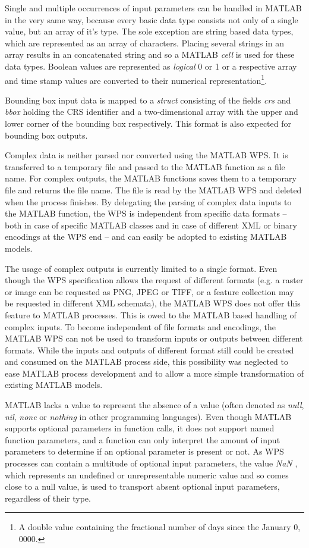 		Single and multiple occurrences of input parameters can be handled in MATLAB in the very same way, because every basic data type consists not only of a single value, but an array of it's type. The sole exception are string based data types, which are represented as an array of characters. Placing several strings in an array results in an concatenated string and so a MATLAB \emph{cell} is used for these data types. Boolean values are represented as \emph{logical} 0 or 1 or a respective array and time stamp values are converted to their numerical representation\footnote{A double value containing the fractional number of days since the January 0, 0000.}.

		Bounding box input data is mapped to a \emph{struct} consisting of the fields \emph{crs} and \emph{bbox} holding the \ac{CRS} identifier and a two-dimensional array with the upper and lower corner of the bounding box respectively. This format is also expected for bounding box outputs.

		Complex data is neither parsed nor converted using the MATLAB WPS. It is transferred to a temporary file and passed to the MATLAB function as a file name. For complex outputs, the MATLAB functions saves them to a temporary file and returns the file name. The file is read by the MATLAB WPS and deleted when the process finishes. By delegating the parsing of complex data inputs to the MATLAB function, the WPS is independent from specific data formats -- both in case of specific MATLAB classes and in case of different XML or binary encodings at the WPS end -- and can easily be adopted to existing MATLAB models.

		The usage of complex outputs is currently limited to a single format. Even though the WPS specification allows the request of different formats (e.g. a raster or image can be requested as PNG, JPEG or TIFF, or a feature collection may be requested in different XML schemata), the MATLAB WPS does not offer this feature to MATLAB processes. This is owed to the MATLAB based handling of complex inputs. To  become independent of file formats and encodings, the MATLAB WPS can not be used to transform inputs or outputs between different formats. While the inputs and outputs of different format still could be created and consumed on the MATLAB process side, this possibility was neglected to ease MATLAB process development and to allow a more simple transformation of existing MATLAB models.

		MATLAB lacks a value to represent the absence of a value (often denoted as \emph{null}, \emph{nil}, \emph{none} or \emph{nothing} in other programming languages). Even though MATLAB supports optional parameters in function calls, it does not support named function parameters, and a function can only interpret the amount of input parameters to determine if an optional parameter is present or not. As WPS processes can contain a multitude of optional input parameters, the value \emph{NaN} \citep{ieee:754:2008}, which represents an undefined or unrepresentable numeric value and so comes close to a null value, is used to transport absent optional input parameters, regardless of their type.

